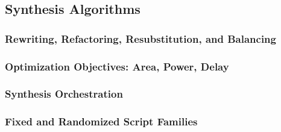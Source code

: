 \subsection{Synthesis Algorithms}
\label{sec:prelim:algorithms}

\subsubsection{Rewriting, Refactoring, Resubstitution, and Balancing}
\label{sec:prelim:algorithms:primitives}

\subsubsection{Optimization Objectives: Area, Power, Delay}
\label{sec:prelim:synthesis:objectives}

\subsubsection{Synthesis Orchestration}
\label{sec:prelim:algorithms:orchestrate}

\subsubsection{Fixed and Randomized Script Families}
\label{sec:prelim:algorithms:others}
